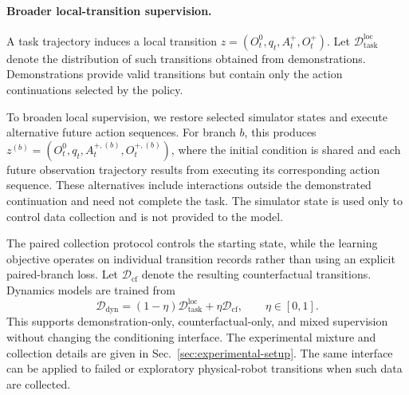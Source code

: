 \paragraph{Broader local-transition supervision.}
A task trajectory induces a local transition
$z=( O_t^0,q_t, A_t^+, O_t^+)$.
Let $\mathcal D_{\mathrm{task}}^{\mathrm{loc}}$ denote the distribution of
such transitions obtained from demonstrations. Demonstrations provide valid
transitions but contain only the action continuations selected by the
policy.

To broaden local supervision, we restore selected simulator states and
execute alternative future action sequences. For branch $b$, this produces
$z^{(b)}=( O_t^0,q_t, A_t^{+,(b)},
 O_t^{+,(b)})$, where the initial condition is shared and each
future observation trajectory results from executing its corresponding
action sequence. These alternatives include interactions outside the
demonstrated continuation and need not complete the task. The simulator
state is used only to control data collection and is not provided to the
model.

The paired collection protocol controls the starting state, while the
learning objective operates on individual transition records rather than
using an explicit paired-branch loss. Let $\mathcal D_{\mathrm{cf}}$ denote
the resulting counterfactual transitions. Dynamics models are trained from
\begin{equation}
\mathcal D_{\mathrm{dyn}}
=
(1-\eta)\mathcal D_{\mathrm{task}}^{\mathrm{loc}}
+
\eta\mathcal D_{\mathrm{cf}},
\qquad
\eta\in[0,1].
\label{eq:dynamics-training-distribution}
\end{equation}
This supports demonstration-only, counterfactual-only, and mixed
supervision without changing the conditioning interface. The experimental
mixture and collection details are given in Sec.~\ref{sec:experimental-setup}.
The same interface can be applied to failed or exploratory physical-robot transitions when such data are collected.

